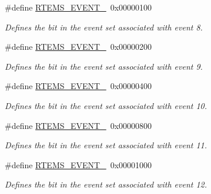 \begin{DoxyCompactItemize}
\mbox{\label{group__ClassicEventSet_gafaabd55cfdbf6e532aa01ea2539e0de8}} 
\#define \mbox{\hyperlink{group__ClassicEventSet_gafaabd55cfdbf6e532aa01ea2539e0de8}{R\+T\+E\+M\+S\+\_\+\+E\+V\+E\+N\+T\+\_}}~0x00000100
\begin{DoxyCompactList}\small\item\em Defines the bit in the event set associated with event 8. \end{DoxyCompactList}\item 
\mbox{\label{group__ClassicEventSet_ga49d31446c796375a43cc1af00d1d9c8d}} 
\#define \mbox{\hyperlink{group__ClassicEventSet_ga49d31446c796375a43cc1af00d1d9c8d}{R\+T\+E\+M\+S\+\_\+\+E\+V\+E\+N\+T\+\_}}~0x00000200
\begin{DoxyCompactList}\small\item\em Defines the bit in the event set associated with event 9. \end{DoxyCompactList}\item 
\mbox{\label{group__ClassicEventSet_ga582abc00f2621a2225de4235737c81b2}} 
\#define \mbox{\hyperlink{group__ClassicEventSet_ga582abc00f2621a2225de4235737c81b2}{R\+T\+E\+M\+S\+\_\+\+E\+V\+E\+N\+T\+\_}}~0x00000400
\begin{DoxyCompactList}\small\item\em Defines the bit in the event set associated with event 10. \end{DoxyCompactList}\item 
\mbox{\label{group__ClassicEventSet_gaa2b80e0f9b953212661df4c70e53d836}} 
\#define \mbox{\hyperlink{group__ClassicEventSet_gaa2b80e0f9b953212661df4c70e53d836}{R\+T\+E\+M\+S\+\_\+\+E\+V\+E\+N\+T\+\_}}~0x00000800
\begin{DoxyCompactList}\small\item\em Defines the bit in the event set associated with event 11. \end{DoxyCompactList}\item 
\mbox{\label{group__ClassicEventSet_ga7513eafe825ada821c15458007157571}} 
\#define \mbox{\hyperlink{group__ClassicEventSet_ga7513eafe825ada821c15458007157571}{R\+T\+E\+M\+S\+\_\+\+E\+V\+E\+N\+T\+\_}}~0x00001000
\begin{DoxyCompactList}\small\item\em Defines the bit in the event set associated with event 12. \end{DoxyCompactList}\item 

\end{DoxyCompactItemize}
